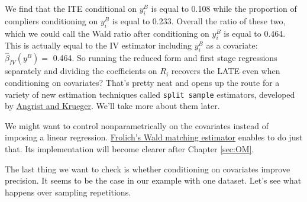 \documentclass[]{book}
\newenvironment{Shaded}{\begin{snugshade}}{\end{snugshade}}
\newcommand{\KeywordTok}[1]{\textcolor[rgb]{0.13,0.29,0.53}{\textbf{#1}}}
\newcommand{\DecValTok}[1]{\textcolor[rgb]{0.00,0.00,0.81}{#1}}
\newcommand{\StringTok}[1]{\textcolor[rgb]{0.31,0.60,0.02}{#1}}
\newcommand{\OperatorTok}[1]{\textcolor[rgb]{0.81,0.36,0.00}{\textbf{#1}}}
\newcommand{\NormalTok}[1]{#1}
\theoremstyle{definition}
\theoremstyle{definition}
\theoremstyle{definition}
\theoremstyle{remark}
\let\BeginKnitrBlock\begin \let\EndKnitrBlock\end
\begin{document}
\begin{Shaded}
\end{Shaded}

We find that the ITE conditional on \(y^B_i\) is equal to 0.108 while
the proportion of compliers conditioning on \(y_i^B\) is equal to 0.233.
Overall the ratio of these two, which we could call the Wald ratio after
conditioning on \(y_i^B\) is equal to 0.464. This is actually equal to
the IV estimator including \(y_i^B\) as a covariate:
\(\hat{\beta}_{IV}(y^B)=\) 0.464. So running the reduced form and first
stage regressions separately and dividing the coefficients on \(R_i\)
recovers the LATE even when conditioning on covariates? That's pretty
neat and opens up the route for a variety of new estimation techniques
called \texttt{split\ sample} estimators, developed by
\href{http://economics.mit.edu/files/398}{Angrist and Krueger}. We'll
take more about them later.

\BeginKnitrBlock{remark}
\iffalse{} {Remark. } \fi{}We might want to control nonparametrically on
the covariates instead of imposing a linear regression.
\href{https://www.sciencedirect.com/science/article/abs/pii/S0304407606001023}{Frolich's
Wald matching estimator} enables to do just that. Its implementation
will become clearer after Chapter \ref{sec:OM}.
\EndKnitrBlock{remark}

\BeginKnitrBlock{remark}
\iffalse{} {Remark. } \fi{}The last thing we want to check is whether
conditioning on covariates improve precision. It seems to be the case in
our example with one dataset. Let's see what happens over sampling
repetitions.
\EndKnitrBlock{remark}
\end{document}
